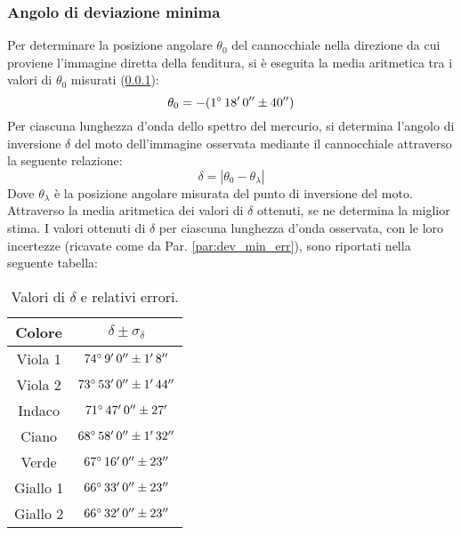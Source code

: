 \documentclass[]{article}
\begin{document}
    \subsubsection{Angolo di deviazione minima}
    Per determinare la posizione angolare $\theta_0$ del cannocchiale nella direzione da cui proviene l'immagine diretta della fenditura, si è eseguita la media aritmetica tra i valori di $\theta_0$ misurati (\ref{}):
    \begin{equation}
        \label{theta-0}
        \theta_0 = -(1 \degree \, 18' \, 0'' \pm 40'') 
    \end{equation}
    Per ciascuna lunghezza d'onda dello spettro del mercurio, si determina l'angolo di inversione $\delta$ del moto dell'immagine osservata mediante il cannocchiale attraverso la seguente relazione:
    \begin{equation}
        \label{delta}
        \delta = | \theta_0 - \theta_{\lambda}|
    \end{equation}
    Dove $\theta_{\lambda}$ è la posizione angolare misurata del punto di inversione del moto.
    Attraverso la media aritmetica dei valori di $\delta$ ottenuti, se ne determina la miglior stima. I valori ottenuti di $\delta$ per ciascuna lunghezza d'onda osservata, con le loro incertezze (ricavate come da Par. \ref{par:dev_min_err}), sono riportati nella seguente tabella:
    \begin{table} [H]
        \centering
        \begin{tabular}{||c|c||}
            \hline
            Colore & $\delta \pm \sigma_{\delta}$\\
            \hline \hline
            Viola 1 & $ 74 \degree \, 9' \, 0'' \pm 1' \, 8'' $ \\\hline
            Viola 2 & $ 73 \degree \, 53'\, 0'' \pm 1' \, 44'' $ \\\hline
            Indaco & $ 71 \degree \, 47'\, 0'' \pm 27'  $ \\\hline
            Ciano & $ 68 \degree \, 58'\, 0'' \pm 1' \, 32'' $ \\\hline
            Verde & $ 67 \degree \, 16'\, 0'' \pm 23'' $ \\\hline
            Giallo 1 & $ 66 \degree \, 33'\, 0'' \pm 23'' $ \\\hline
            Giallo 2 & $ 66 \degree \, 32' \, 0''\pm 23'' $ \\\hline
        \end{tabular}
        \caption{Valori di $\delta$ e relativi errori.}
        \label{d-values}
    \end{table}
\end{document}

